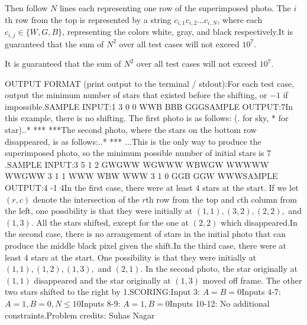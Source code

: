 \documentclass[12pt]{article}
\begin{document}
Then follow $N$ lines each representing one row of the superimposed photo.  The
$i$th row from the top is represented by a string $c_{i,1}c_{i,2}\dots c_{i,N}$,
where each $c_{i,j} \in \{W,G,B\}$, representing the colors white, gray, and
black respectively.It is guaranteed that the sum of $N^2$ over all test cases will not exceed
$10^7$.

It is guaranteed that the sum of $N^2$ over all test cases will not exceed
$10^7$.

OUTPUT FORMAT (print output to the terminal / stdout):For each test case, output the minimum number of stars that existed before the
shifting, or $-1$ if impossible.SAMPLE INPUT:1
3 0 0
WWB
BBB
GGGSAMPLE OUTPUT:7In this example, there is no shifting. The first photo is as follows: (. for
sky, * for star)..*
***
***The second photo, where the stars on the bottom row disappeared, is as follows:..*
***
...This is the only way to produce the superimposed photo, so the minimum possible
number of initial stars is $7$.SAMPLE INPUT:3
5 1 2
GWGWW
WGWWW
WBWGW
WWWWW
WWGWW
3 1 1
WWW
WBW
WWW
3 1 0
GGB
GGW
WWWSAMPLE OUTPUT:4
-1
4In the first case, there were at least $4$ stars at the start. If we let $(r,c)$
denote the intersection of the $r$th row from the top and $c$th column from the
left, one possibility is that they were initially at $(1,1), (3,2), (2,2),$  and
$(1,3)$. All the stars shifted, except for the one at $(2,2)$ which disappeared.In the second case, there is no arrangement of stars in the initial photo that
can produce the middle black pixel given the shift.In the third case, there were at least $4$ stars at the start. One possibility
is that they were initially at $(1,1), (1,2), (1,3),$ and $(2,1)$. In the second
photo, the star originally at $(1,1)$ disappeared and the star originally at
$(1,3)$ moved off frame. The other two stars shifted to the right by 1.SCORING:Input 3: $A=B=0$Inputs 4-7: $A=1, B=0, N\le 10$Inputs 8-9: $A=1, B=0$Inputs 10-12: No additional constraints.Problem credits: Suhas Nagar
\end{document}
